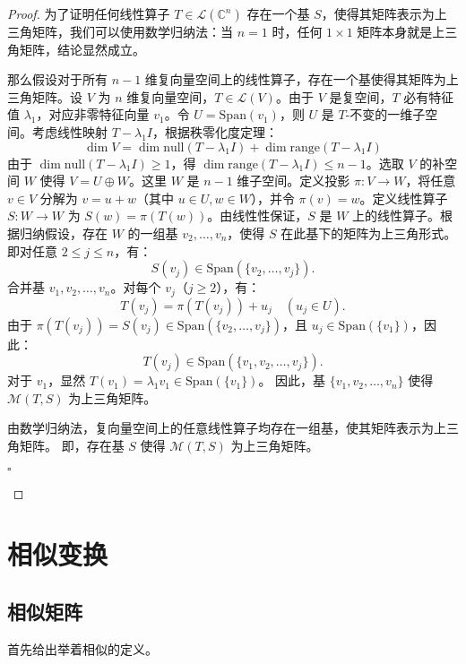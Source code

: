\begin{proof}
	为了证明任何线性算子 $ T \in \mathcal{L}(\mathbb{C}^n) $ 存在一个基 $ S $，使得其矩阵表示为上三角矩阵，我们可以使用数学归纳法：当 $ n=1 $ 时，任何 $ 1 \times 1 $ 矩阵本身就是上三角矩阵，结论显然成立。

	那么假设对于所有 $ n-1 $ 维复向量空间上的线性算子，存在一个基使得其矩阵为上三角矩阵。设 $ V $ 为 $ n $ 维复向量空间，$ T \in \mathcal{L}(V) $。由于 $ V $ 是复空间，$ T $ 必有特征值 $ \lambda_1 $，对应非零特征向量 $ v_1 $。令 $ U = \text{Span}(v_1) $，则 $ U $ 是 $ T $-不变的一维子空间。考虑线性映射 $ T - \lambda_1 I $，根据秩零化度定理：$$\dim V = \dim \text{null}(T - \lambda_1 I) + \dim \text{range}(T - \lambda_1 I)$$由于 $ \dim \text{null}(T - \lambda_1 I) \geq 1 $，得 $ \dim \text{range}(T - \lambda_1 I) \leq n - 1 $。选取 $ V $ 的补空间 $ W $ 使得 $ V = U \oplus W $。这里 $ W $ 是 $ n-1 $ 维子空间。定义投影 $ \pi: V \to W $，将任意 $ v \in V $ 分解为 $ v = u + w $（其中 $ u \in U, w \in W $），并令 $ \pi(v) = w $。定义线性算子 $ S: W \to W $ 为 $ S(w) = \pi(T(w)) $。由线性性保证，$ S $ 是 $ W $ 上的线性算子。根据归纳假设，存在 $ W $ 的一组基 $ v_2, \dots, v_n $，使得 $ S $ 在此基下的矩阵为上三角形式。即对任意 $ 2 \leq j \leq n $，有：$$S(v_j) \in \text{Span}(\{v_2, \dots, v_j\}).$$合并基 $ v_1, v_2, \dots, v_n $。对每个 $ v_j $（$ j \geq 2 $），有：  
$$
T(v_j) = \pi(T(v_j)) + u_j \quad (u_j \in U).
$$
由于 $ \pi(T(v_j)) = S(v_j) \in \text{Span}(\{v_2, \dots, v_j\}) $，且 $ u_j \in \text{Span}(\{v_1\}) $，因此：  
$$
T(v_j) \in \text{Span}(\{v_1, v_2, \dots, v_j\}).
$$
对于 $ v_1 $，显然 $ T(v_1) = \lambda_1 v_1 \in \text{Span}(\{v_1\}) $。  
因此，基 $ \{v_1, v_2, \dots, v_n\} $ 使得 $ \mathcal{M}(T, S) $ 为上三角矩阵。

由数学归纳法，复向量空间上的任意线性算子均存在一组基，使其矩阵表示为上三角矩阵。  
即，存在基 $ S $ 使得 $ \mathcal{M}(T, S) $ 为上三角矩阵。
\begin{flushright}
		$\square$
	\end{flushright}
\end{proof}

\section{相似变换}

\subsection{相似矩阵}

首先给出举着相似的定义。

